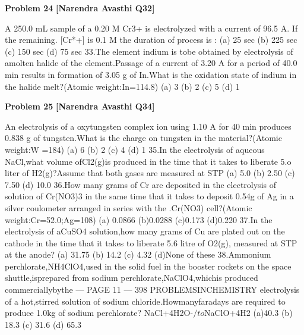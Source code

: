 \begin{problembox}
\textbf{Problem 24} \hfill \textbf{[Narendra Avasthi Q32]}
\label{q:ext-narendra_avasthi_all_questions-24}

A 250.0 mL sample of a 0.20 M Cr3+ is electrolyzed with a current of 96.5 A. If the remaining.
[Cr*+] is 0.1 M the duration of process is :
(a) 25 sec
(b) 225 sec
(c) 150 sec
(d) 75 sec
33.The element indium is tobe obtained by electrolysis of amolten halide of the element.Passage
of a current of 3.20 A for a period of 40.0 min results in formation of 3.05 g of In.What is the
oxidation state of indium in the halide melt?(Atomic weight:In=114.8)
(a) 3
(b) 2
(c) 5
(d) 1
\end{problembox}

\begin{problembox}
\textbf{Problem 25} \hfill \textbf{[Narendra Avasthi Q34]}
\label{q:ext-narendra_avasthi_all_questions-25}

An electrolysis of a oxytungsten complex ion using 1.10 A for 40 min produces 0.838 g of
tungsten.What is the charge on tungsten in the material?(Atomic weight:W =184)
(a) 6
(b) 2
(c) 4
(d) 1
35.In the electrolysis of aqueous NaCl,what volume ofCl2(g)is produced in the time that it takes
to liberate 5.o liter of H2(g)?Assume that both gases are measured at STP
(a) 5.0
(b) 2.50
(c) 7.50
(d) 10.0
36.How many grams of Cr are deposited in the electrolysis of solution of Cr(NO3)3 in the same
time that it takes to deposit 0.54g of Ag in a silver coulometer arranged in series with the
.Cr(NO3) cell?(Atomic weight:Cr=52.0;Ag=108)
(a) 0.0866
(b)0.0288
(c)0.173
(d)0.220
37.In the electrolysis of aCuSO4 solution,how many grams of Cu are plated out on the cathode in
the time that it takes to liberate 5.6 litre of O2(g), measured at STP at the anode?
(a) 31.75
(b) 14.2
(c) 4.32
(d)None of these
38.Ammonium perchlorate,NH4ClO4,used in the solid fuel in the booster rockets on the space
shuttle,isprepared from sodium perchlorate,NaClO4,whichis produced commerciallybythe
--- PAGE 11 ---
398
PROBLEMSINCHEMISTRY
electrolysis of a hot,stirred solution of sodium chloride.Howmanyfaradays are required to
produce 1.0kg of sodium perchlorate?
NaCl+4H2O-$/to$NaClO+4H2
(a)40.3
(b) 18.3
(c) 31.6
(d) 65.3
\end{problembox}

